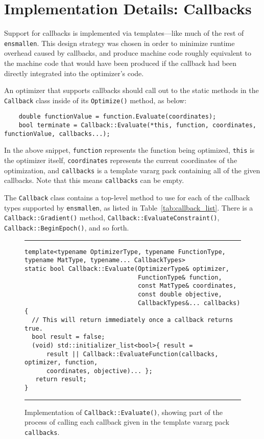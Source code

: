 \section{Implementation Details: Callbacks}

Support for callbacks is implemented via templates---like much
of the rest of {\tt ensmallen}.  This design strategy was chosen in order to
minimize runtime overhead caused by callbacks, and produce machine code roughly
equivalent to the machine code that would have been produced if the callback had
been directly integrated into the optimizer's code.

An optimizer that supports callbacks should call out to the static methods in
the {\tt Callback} class inside of its {\tt Optimize()} method, as below:
%
\begin{verbatim}
    double functionValue = function.Evaluate(coordinates);
    bool terminate = Callback::Evaluate(*this, function, coordinates, functionValue, callbacks...);
\end{verbatim}

In the above snippet, {\tt function} represents the function being optimized,
{\tt *this} is the optimizer itself, {\tt coordinates} represents the current
coordinates of the optimization, and {\tt callbacks} is a template vararg pack
containing all of the given callbacks.
Note that this means {\tt callbacks} can be empty.

The {\tt Callback} class contains a top-level method to use for each of the
callback types supported by {\tt ensmallen}, as listed in Table~\ref{tab:callback_list}.
There is a {\tt Callback::Gradient()} method, {\tt Callback::EvaluateConstraint()},
{\tt Callback::BeginEpoch()}, and so forth. 

\begin{figure}[b!]
\hrule
\vspace{1ex}
\begin{verbatim}
template<typename OptimizerType, typename FunctionType, typename MatType, typename... CallbackTypes>
static bool Callback::Evaluate(OptimizerType& optimizer,
                               FunctionType& function,
                               const MatType& coordinates,
                               const double objective,
                               CallbackTypes&... callbacks)
{
  // This will return immediately once a callback returns true.
  bool result = false;
  (void) std::initializer_list<bool>{ result =
      result || Callback::EvaluateFunction(callbacks, optimizer, function,
      coordinates, objective)... };
   return result;
}
\end{verbatim}
\hrule
\vspace*{-0.5em}
\caption{Implementation of {\tt Callback::Evaluate()},
showing part of the process of calling each callback
given in the template vararg pack {\tt callbacks}.
}
\label{fig:callback_evaluate}
\end{figure}

